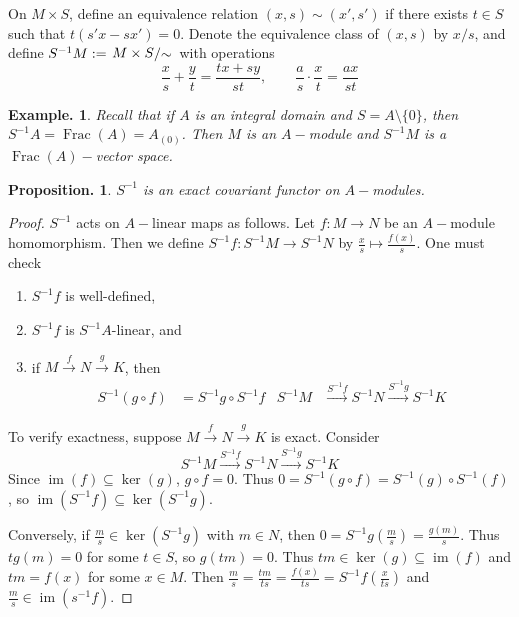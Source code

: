 \documentclass[11pt, a4paper]{memoir}
\newcommand{\fto}[1]{\ensuremath{\xrightarrow{\scriptstyle{#1}}}}
\theoremstyle{change}
\newtheorem{proposition}[theorem]{Proposition.}
\theoremstyle{plain}
\theoremstyle{nonumberplain}
\newtheorem{example}{Example.}
\newtheorem{proof}{Proof}
\DeclareMathOperator{\Frac}{Frac}
\DeclareMathOperator{\im}{im}
\newcommand{\quot}[2]{\mathchoice{\left.\raisebox{0.10em}{$#1$}\middle/\raisebox{-0.10em}{$#2$}\right.}
                                 {\left.\raisebox{0.04em}{$#1$}\middle/\raisebox{-0.04em}{$#2$}\right.}
                                 {\left.\raisebox{0.01em}{$#1$}\middle/\raisebox{-0.01em}{$#2$}\right.}
                                 {\left.\raisebox{0em}{$#1$}\middle/\raisebox{0em}{$#2$}\right.}}
\numberwithin{equation}{section}
\begin{document}
On $M\times S$, define an equivalence relation $(x,s)\sim(x',s')$ if there exists $t\in S$ such that $t(s'x-sx')=0$.
Denote the equivalence class of $(x,s)$ by $x/s$, and define $S^{-1}M:=\quot{M\times S}{\sim}$ with operations
\begin{equation*}
    \frac{x}{s}+\frac{y}{t}=\frac{tx+sy}{st},\qquad\frac{a}{s}\cdot\frac{x}{t}=\frac{ax}{st}
\end{equation*}
\begin{example}
    Recall that if $A$ is an integral domain and $S=A\setminus\{0\}$, then $S^{-1}A=\Frac(A)=A_{(0)}$.
    Then $M$ is an $A-$module and $S^{-1}M$ is a $\Frac(A)-$vector space.
\end{example}
\begin{proposition}
    $S^{-1}$ is an exact covariant functor on $A-$modules.
\end{proposition}
\begin{proof}
    $S^{-1}$ acts on $A-$linear maps as follows.
    Let $f:M\to N$ be an $A-$module homomorphism.
    Then we define $S^{-1}f:S^{-1}M\to S^{-1}N$ by $\frac{x}{s}\mapsto\frac{f(x)}{s}$.
    One must check
    \begin{enumerate}[nolistsep]
        \item $S^{-1}f$ is well-defined,
        \item $S^{-1}f$ is $S^{-1}A$-linear, and
        \item if $M\fto{f}N\fto{g}K$, then
            \begin{align*}
                S^{-1}(g\circ f)&=S^{-1}g\circ S^{-1}f & S^{-1}M&\fto{S^{-1}f}S^{-1}N\fto{S^{-1}g}S^{-1}K
            \end{align*}
    \end{enumerate}
    To verify exactness, suppose $M\fto{f} N\fto{g} K$ is exact.
    Consider
    \begin{equation*}
        S^{-1}M\fto{S^{-1}f}S^{-1}N\fto{S^{-1}g}S^{-1}K
    \end{equation*}
    Since $\im(f)\subseteq\ker(g)$, $g\circ f=0$.
    Thus $0=S^{-1}(g\circ f)=S^{-1}(g)\circ S^{-1}(f)$, so $\im(S^{-1} f)\subseteq\ker(S^{-1}g)$.

    Conversely, if $\frac{m}{s}\in\ker(S^{-1}g)$ with $m\in N$, then $0=S^{-1}g\left(\frac{m}{s}\right)=\frac{g(m)}{s}$.
    Thus $tg(m)=0$ for some $t\in S$, so $g(tm)=0$.
    Thus $tm\in\ker(g)\subseteq\im(f)$ and $tm=f(x)$ for some $x\in M$.
    Then $\frac{m}{s}=\frac{tm}{ts}=\frac{f(x)}{ts}=S^{-1}f\left(\frac{x}{ts}\right)$ and $\frac{m}{s}\in\im(s^{-1}f)$.
\end{proof}
\end{document}
